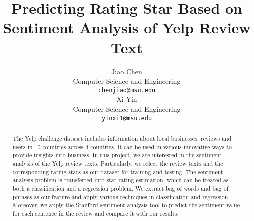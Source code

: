\documentclass[11pt]{article}
\title{Predicting Rating Star Based on Sentiment Analysis of Yelp Review Text}
\author{Jiao Chen \\
  Computer Science and Engineering\\
  {\tt chenjiao@msu.edu} \\\And
  Xi Yin\\
  Computer Science and Engineering\\
  {\tt yinxi1@msu.edu} \\}
\date{}
\begin{document}
\maketitle
\begin{abstract}
  The Yelp challenge dataset includes information about local businesses, reviews and users in $10$ countries across $4$ countries.
  It can be used in various innovative ways to provide insights into business.
  In this project, we are interested in the sentiment analysis of the Yelp review texts.
  Particularly, we select the review texts and the corresponding rating stars as our dataset for training and testing.
  The sentiment analysis problem is transferred into star rating estimation, which can be treated as both a classification and a regression problem.
  We extract bag of words and bag of phrases as our feature and apply various techniques in classification and regression.
  Moreover, we apply the Stanford sentiment analysis tool to predict the sentiment value for each sentence in the review and compare it with our results.
\end{abstract}




%






\clearpage
{\small


}

%
%
%
%
%
%
\end{document}
